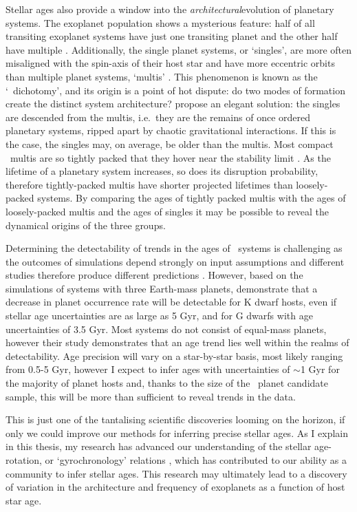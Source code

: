 Stellar ages also provide a window into the {\it architectural}\/evolution of
planetary systems.
The exoplanet population shows a mysterious feature: half of all transiting
exoplanet systems have just one transiting planet and the other half have
multiple \citep[e.g.][]{lissauer, johansen, ballard}.
Additionally, the single planet systems, or `singles', are more often
misaligned with the spin-axis of their host star and have more eccentric
orbits than multiple planet systems, `multis' \citep[e.g.][]{morton, winn}.
This phenomenon is known as the `\Kepler\ dichotomy', and its origin is
a point of hot dispute: do two modes of formation create the distinct system
architecture?
\citet{Pu2015} propose an elegant solution: the singles are descended from the
multis, i.e.\ they are the remains of once ordered planetary systems, ripped
apart by chaotic gravitational interactions.
If this is the case, the singles may, on average, be older than the multis.
Most compact \Kepler\ multis are so tightly packed that they hover near the
stability limit \citep{fang}.
As the lifetime of a planetary system increases, so does its disruption
probability, therefore tightly-packed multis have shorter projected lifetimes
than loosely-packed systems.
By comparing the ages of tightly packed multis with the ages of loosely-packed
multis and the ages of singles it may be possible to reveal the dynamical
origins of the three groups.

Determining the detectability of trends in the ages of \Kepler\ systems is
challenging as the outcomes of simulations depend strongly on input
assumptions and different studies therefore produce different predictions
\citep[see figure 3 of][]{Pu2015}.
However, based on the \citet{smith} simulations of systems with three
Earth-mass planets, \citet{veras} demonstrate that a decrease in planet
occurrence rate will be detectable for K dwarf hosts, even if stellar age
uncertainties are as large as 5 Gyr, and for G dwarfs with age uncertainties of
3.5 Gyr.
Most systems do not consist of equal-mass planets, however their study
demonstrates that an age trend lies well within the realms of detectability.
Age precision will vary on a star-by-star basis, most likely ranging from
0.5-5 Gyr, however I expect to infer ages with uncertainties of $\sim$1 Gyr
for the majority of planet hosts and, thanks to the size of the \Kepler\
planet candidate sample, this will be more than sufficient to reveal trends in
the data.

This is just one of the tantalising scientific discoveries looming on the
horizon, if only we could improve our methods for inferring precise stellar
ages.
As I explain in this thesis, my research has advanced our understanding of the
stellar age-rotation, or `gyrochronology' relations \citep{angus}, which has
contributed to our ability as a community to infer stellar ages.
This research may ultimately lead to a discovery of variation in the
architecture and frequency of exoplanets as a function of host star age.

